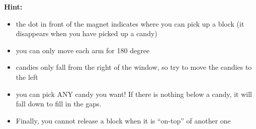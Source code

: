 \documentclass[12pt]{article}
\begin{document}
{\bf Hint:}
\begin{itemize}
	\item the dot in front of the magnet indicates where you can pick up a block (it disappears when you have picked up a candy)
	\item you can only move each arm for 180 degree
	\item candies only fall from the right of the window, so try to move the candies to the left
	\item you can pick ANY candy you want! If there is nothing below a candy, it will fall down to fill in the gaps.
	\item Finally, you cannot release a block when it is ``on-top'' of another one
\end{itemize}
\end{document}

